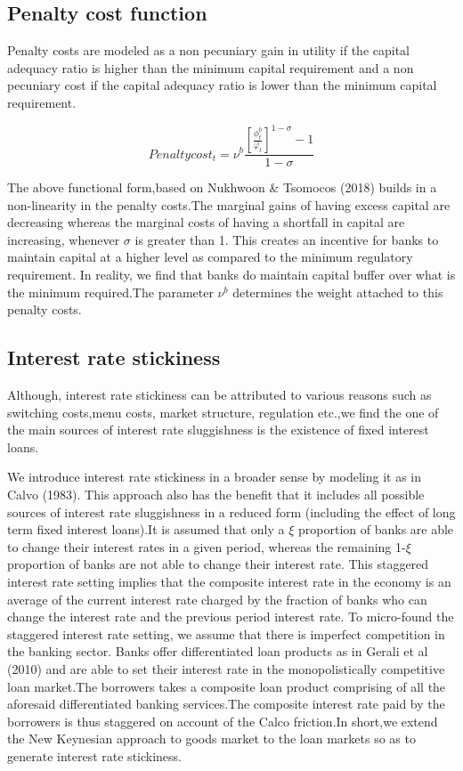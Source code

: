 \documentclass[12pt]{article}
\numberwithin{equation}{section}
\begin{document}
\begin{appendix}
\subsection*{Penalty cost function}

Penalty costs are modeled as a non pecuniary gain in utility if the capital adequacy ratio is higher than the minimum capital requirement and a non pecuniary cost if the capital adequacy ratio is lower than the minimum capital requirement.

\begin{equation}
Penalty cost_t=\nu^b \frac{[\frac{\phi^b_t}{\bar{\varphi_t}}]^{1-\sigma}-1}{{1-\sigma}}
\end{equation}

The above functional form,based on Nukhwoon \& Tsomocos (2018) builds in a non-linearity in the penalty costs.The marginal gains of having excess capital are decreasing whereas the marginal costs of having a shortfall in capital are increasing, whenever $\sigma$ is greater than 1. This creates an incentive for banks to maintain capital at a higher level as compared to the minimum regulatory requirement. In reality, we find that banks do maintain capital buffer over what is the minimum required.The parameter $\nu^b$ determines the weight attached to this penalty costs.

\subsection*{Interest rate stickiness}

Although, interest rate stickiness can be attributed to various reasons such as switching costs,menu costs, market structure, regulation etc.,we find the one of the main sources of interest rate sluggishness is the existence of fixed interest loans.

We introduce interest rate stickiness in a broader sense by modeling it as in Calvo (1983). This approach also has the benefit that it includes all possible sources of interest rate sluggishness in a reduced form (including the effect of long term fixed interest loans).It is assumed that only a $\xi$ proportion of banks are able to change their interest rates in a given period, whereas the remaining 1-$\xi$ proportion of banks are not able to change their interest rate. This staggered interest rate setting implies that the composite interest rate in the economy is an average of the current interest rate charged by the fraction of banks who can change the interest rate and the previous period interest rate.
To micro-found the staggered interest rate setting, we assume that there is imperfect competition in the banking sector. Banks offer differentiated loan products as in Gerali et al (2010) and are able to set their interest rate in the monopolistically competitive loan market.The borrowers takes a composite loan product comprising of all the aforesaid differentiated banking services.The composite interest rate paid by the borrowers is thus staggered on account of the Calco friction.In short,we extend the New Keynesian approach to goods market to the loan markets so as to generate interest rate stickiness. 


\end{appendix}
\end{document}
